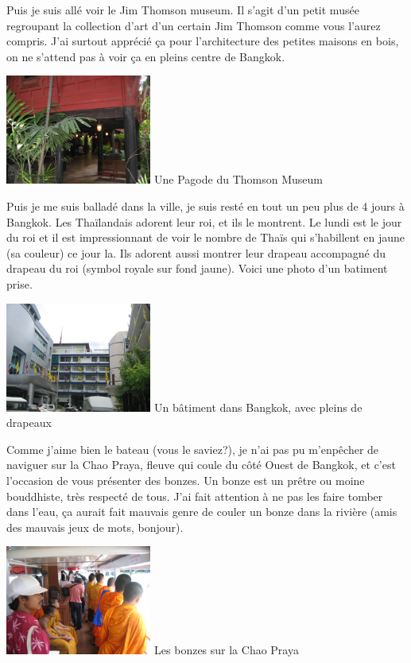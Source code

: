 \begin{multicols}{2}
Puis je suis allé voir le Jim Thomson museum. Il s'agit d'un petit musée regroupant la collection d'art d'un certain Jim Thomson comme vous l'aurez compris. J'ai surtout apprécié ça pour l'architecture des petites maisons en bois, on ne s'attend pas à voir ça en pleins centre de Bangkok.

\hspace*{-0.65cm}
\includegraphics[width=4.8cm]{articles/Bangkok/1338.jpg}
Une Pagode du Thomson Museum

Puis je me suis balladé dans la ville, je suis resté en tout un peu plus de 4 jours à Bangkok. Les Thaïlandais adorent leur roi, et ils le montrent. Le lundi est le jour du roi et il est impressionnant de voir le nombre de Thaïs qui s'habillent en jaune (sa couleur) ce jour la. Ils adorent aussi montrer leur drapeau accompagné du drapeau du roi (symbol royale sur fond jaune). Voici une photo d'un batiment prise.

\hspace*{-0.65cm}
\includegraphics[width=4.8cm]{articles/Bangkok/1395.jpg}
Un bâtiment dans Bangkok, avec pleins de drapeaux

Comme j'aime bien le bateau (vous le saviez?), je n'ai pas pu m'enpêcher de naviguer sur la Chao Praya, fleuve qui coule du côté Ouest de Bangkok, et c'est l'occasion de vous présenter des bonzes. Un bonze est un prêtre ou moine bouddhiste, très respecté de tous. J'ai fait attention à ne pas les faire tomber dans l'eau, ça aurait fait mauvais genre de couler un bonze dans la rivière (amis des mauvais jeux de mots, bonjour).

\hspace*{-0.65cm}
\includegraphics[width=4.8cm]{articles/Bangkok/1396.jpg}
Les bonzes sur la Chao Praya


\end{multicols}
